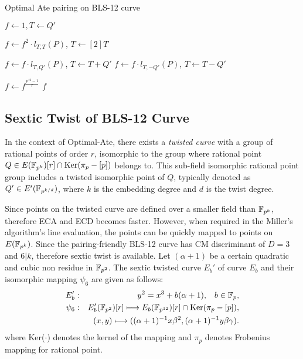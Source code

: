 \begin{algorithm}[H]
	\caption{Optimal Ate pairing on BLS-12 curve}
	\label{optimal_algo}
	\DontPrintSemicolon

	\hspace{-3ex}
\hspace{-3ex}
	
	\nl $f \leftarrow 1,T \leftarrow Q'$\;
	\nl {} {
	\nl $f\leftarrow f^2\cdot l_{T,T}(P)$, $T\leftarrow [2]T$\;

	\nl {} {
	\nl $f\leftarrow f\cdot l_{T,Q'}(P)$, $T\leftarrow T+Q'$}
    \nl {} {
	\nl $f\leftarrow f\cdot l_{T,-Q'}(P)$, $T\leftarrow T-Q'$}}
	\nl $f\leftarrow f^{\frac{p^{12}-1}{r}}$\;
	 $f$\;
\end{algorithm}
\vspace{-0.6em}

\subsection{Sextic Twist of BLS-12 Curve} \label{sextic_twist}
In the context of Optimal-Ate, there exists a \textit{twisted curve} with a group of rational points of order $r$, isomorphic to the group where rational point $Q \in  E({\mathbb{F}}_{p^{k}}) [r] \cap \text{Ker}(\pi_p - [p])$  belongs to. This sub-field isomorphic rational point group includes a twisted isomorphic point of $Q$, typically denoted as $Q' \in E'(\mathbb{F}_{p^{k/d}})$, where $k$ is the embedding degree and $d$ is the twist degree.  

Since points on the twisted curve are defined over a smaller field than $\mathbb{F}_{p^k}$, therefore ECA and ECD becomes faster. 
However, when required in the Miller's algorithm's line evaluation, the points can be quickly mapped to points on $E(\mathbb{F}_{p^k} )$. 
Since the pairing-friendly BLS-12 \cite{bls} curve has CM discriminant of $D = 3$ and $6|k$, therefore sextic twist is available.
Let $(\alpha+1)$ be a certain quadratic and cubic non residue in $\mathbb{F}_{p^2}$.  The sextic twisted curve $E_b'$ of  curve $E_b$ and their isomorphic mapping $\psi_6$ are given as follows:
\begin{eqnarray}
	E_b'&:&y^2=x^3+b(\alpha+1),\;\;\;b\in{\mathbb{F}}_{p}, \nonumber\\
	\psi_6&:&E_b'(\mathbb{F}_{p^2})[r] \longmapsto E_b(\mathbb{F}_{p^{12}})[r]\cap {\rm Ker}(\pi_p-[p]),\nonumber\\
	&&(x,y)\longmapsto ((\alpha+1)^{-1}x \beta^2,(\alpha+1)^{-1}y\beta\gamma).\label{map_bn}
\end{eqnarray}
where Ker($\cdot$) denotes the kernel of the mapping and $\pi_p$ denotes Frobenius mapping  for rational point.

